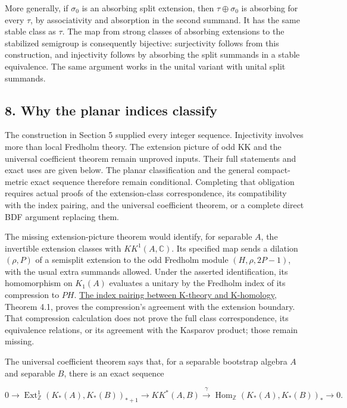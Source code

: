 \documentclass[
  11pt,
]{article}
\begin{document}
More generally, if \(\sigma_0\) is an absorbing split extension, then
\(\tau\oplus\sigma_0\) is absorbing for every \(\tau\), by associativity
and absorption in the second summand. It has the same stable class as
\(\tau\). The map from strong classes of absorbing extensions to the
stabilized semigroup is consequently bijective: surjectivity follows
from this construction, and injectivity follows by absorbing the split
summands in a stable equivalence. The same argument works in the unital
variant with unital split summands.

\subsection{8. Why the planar indices
classify}\label{why-the-planar-indices-classify}

The construction in Section 5 supplied every integer sequence.
Injectivity involves more than local Fredholm theory. The extension
picture of odd KK and the universal coefficient theorem remain unproved
inputs. Their full statements and exact uses are given below. The planar
classification and the general compact-metric exact sequence therefore
remain conditional. Completing that obligation requires actual proofs of
the extension-class correspondence, its compatibility with the index
pairing, and the universal coefficient theorem, or a complete direct BDF
argument replacing them.

The missing extension-picture theorem would identify, for separable
\(A\), the invertible extension classes with \(KK^1(A,\mathbb C)\). Its
specified map sends a dilation \((\rho,P)\) of a semisplit extension to
the odd Fredholm module \((H,\rho,2P-1)\), with the usual extra summands
allowed. Under the asserted identification, its homomorphism on
\(K_1(A)\) evaluates a unitary by the Fredholm index of its compression
to \(PH\). \href{KT-KK-04.html}{The index pairing between K-theory and
K-homology}, Theorem 4.1, proves the compression's agreement with the
extension boundary. That compression calculation does not prove the full
class correspondence, its equivalence relations, or its agreement with
the Kasparov product; those remain missing.

The universal coefficient theorem says that, for a separable bootstrap
algebra \(A\) and separable \(B\), there is an exact sequence

\[
0\longrightarrow
\operatorname{Ext}^1_{\mathbb Z}(K_*(A),K_*(B))_{*+1}
\longrightarrow KK^*(A,B)
\overset{\gamma}{\longrightarrow}
\operatorname{Hom}_{\mathbb Z}(K_*(A),K_*(B))_*
\longrightarrow0.
\]
\end{document}
